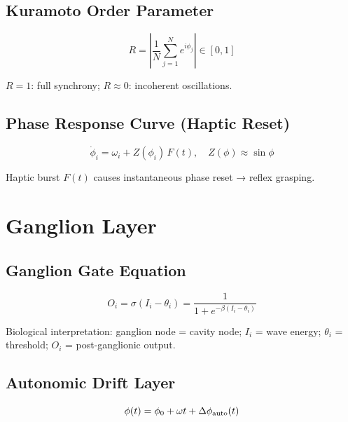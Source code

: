 \documentclass[12pt, a4paper]{article}
\begin{document}
\subsection{Kuramoto Order Parameter}

\begin{equation}\label{eq:order_param}
  R = \left|\frac{1}{N}\sum_{j=1}^{N} e^{i\phi_j}\right| \in [0,1]
\end{equation}

$R = 1$: full synchrony; $R \approx 0$: incoherent oscillations.

\subsection{Phase Response Curve (Haptic Reset)}

\begin{equation}\label{eq:prc}
  \dot{\phi}_i = \omega_i + Z(\phi_i)\,F(t),
  \quad Z(\phi) \approx \sin\phi
\end{equation}

Haptic burst $F(t)$ causes instantaneous phase reset → reflex grasping.

\section{Ganglion Layer}

\subsection{Ganglion Gate Equation}

\begin{equation}\label{eq:ganglion}
  O_i = \sigma(I_i - \theta_i)
  = \frac{1}{1 + e^{-\beta(I_i - \theta_i)}}
\end{equation}

Biological interpretation: ganglion node = cavity node; $I_i$ = wave energy;
$\theta_i$ = threshold; $O_i$ = post-ganglionic output.

\subsection{Autonomic Drift Layer}

\begin{equation}\label{eq:autonomic}
  \phi(t) = \phi_0 + \omega t + \Delta\phi_{\rm auto}(t)
\end{equation}
\end{document}
